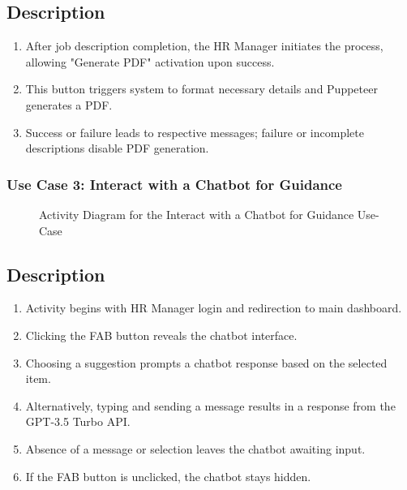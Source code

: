 \subsection*{Description}
\begin{enumerate}
    \item After job description completion, the HR Manager initiates the process, allowing "Generate PDF" activation upon success.
    \item This button triggers system to format necessary details and Puppeteer generates a PDF.
    \item Success or failure leads to respective messages; failure or incomplete descriptions disable PDF generation.
\end{enumerate}



\subsubsection{Use Case 3: Interact with a Chatbot for Guidance}


\begin{figure}[H]
    \centering
    \caption{ Activity Diagram for the Interact with a Chatbot for Guidance Use-Case }
    \label{fig:UseCase3Sprint3_Activity_Diagram}
\end{figure}

\subsection*{Description}
\begin{enumerate}
    \item Activity begins with HR Manager login and redirection to main dashboard.
    \item Clicking the FAB button reveals the chatbot interface.
    \item Choosing a suggestion prompts a chatbot response based on the selected item.
    \item Alternatively, typing and sending a message results in a response from the GPT-3.5 Turbo API.
    \item Absence of a message or selection leaves the chatbot awaiting input.
    \item If the FAB button is unclicked, the chatbot stays hidden.
\end{enumerate}

